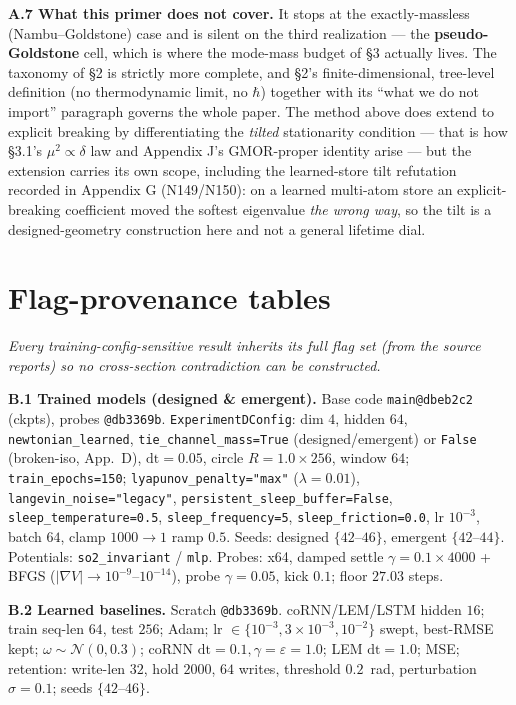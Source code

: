 \documentclass[10pt]{article}
\begin{document}
\textbf{A.7 What this primer does not cover.} It stops at the exactly-massless (Nambu--Goldstone) case and is silent on the third realization --- the \textbf{pseudo-Goldstone} cell, which is where the mode-mass budget of \S3 actually lives. The taxonomy of \S2 is strictly more complete, and \S2's finite-dimensional, tree-level definition (no thermodynamic limit, no $\hbar$) together with its ``what we do not import'' paragraph governs the whole paper. The method above does extend to explicit breaking by differentiating the \emph{tilted} stationarity condition --- that is how \S3.1's $\mu^2\propto\delta$ law and Appendix J's GMOR-proper identity arise --- but the extension carries its own scope, including the learned-store tilt refutation recorded in Appendix G (N149/N150): on a learned multi-atom store an explicit-breaking coefficient moved the softest eigenvalue \emph{the wrong way}, so the tilt is a designed-geometry construction here and not a general lifetime dial.
\label{app:primer}

\section{Flag-provenance tables}\label{app:flags}
\sloppy\small
\emph{Every training-config-sensitive result inherits its full flag set (from the source reports) so no cross-section contradiction can be constructed.}

\textbf{B.1 Trained models (designed \& emergent).} Base code \texttt{main@dbeb2c2} (ckpts), probes \texttt{@db3369b}. \texttt{ExperimentDConfig}: dim $4$, hidden $64$, \texttt{newtonian\_learned}, \texttt{tie\_channel\_mass=True} (designed/emergent) or \texttt{False} (broken-iso, App.~D), $\mathrm{dt}=0.05$, circle $R{=}1.0{\times}256$, window $64$; \texttt{train\_epochs=150}; \texttt{lyapunov\_penalty="max"} ($\lambda{=}0.01$), \texttt{langevin\_noise="legacy"}, \texttt{persistent\_sleep\_buffer=False}, \texttt{sleep\_temperature=0.5}, \texttt{sleep\_frequency=5}, \texttt{sleep\_friction=0.0}, lr $10^{-3}$, batch $64$, clamp $1000{\to}1$ ramp $0.5$. Seeds: designed $\{42$--$46\}$, emergent $\{42$--$44\}$. Potentials: \texttt{so2\_invariant} / \texttt{mlp}. Probes: x64, damped settle $\gamma{=}0.1{\times}4000$ + BFGS ($|\nabla V|{\to}10^{-9}$--$10^{-14}$), probe $\gamma{=}0.05$, kick $0.1$; floor $27.03$ steps.

\textbf{B.2 Learned baselines.} Scratch \texttt{@db3369b}. coRNN/LEM/LSTM hidden $16$; train seq-len $64$, test $256$; Adam; lr $\in\{10^{-3},3{\times}10^{-3},10^{-2}\}$ swept, best-RMSE kept; $\omega\sim\mathcal N(0,0.3)$; coRNN $\mathrm{dt}{=}0.1,\gamma{=}\varepsilon{=}1.0$; LEM $\mathrm{dt}{=}1.0$; MSE; retention: write-len $32$, hold $2000$, $64$ writes, threshold $0.2$~rad, perturbation $\sigma{=}0.1$; seeds $\{42$--$46\}$.
\end{document}
